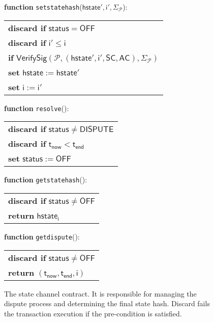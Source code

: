 \documentclass{llncs}
\newcommand{\chanstatus}{\mathsf{status}}
\newcommand{\chandispute}{\mathsf{DISPUTE}}
\newcommand{\chanoff}{\mathsf{OFF}}
\newcommand{\hstate}{\mathsf{hstate}}
\newcommand{\hstatei}{\mathsf{hstate}_{\monotoniccounter}}
\newcommand{\monotoniccounter}{\mathsf{i}}
\newcommand{\participant}{\mathcal{P}}
\newcommand{\statechannel}{\mathsf{SC}}
\newcommand{\verifysig}{\mathsf{VerifySig}}
\newcommand{\appcontract}{\mathsf{AC}}
\newcommand{\timenow}{\mathsf{t}_{\mathsf{now}}}
\newcommand{\timeend}{\mathsf{t}_{\mathsf{end}}}
\newcommand{\oninput}{\textcolor{entry}{\bf function }}
\newcommand{\stringlitt}[1]{\texttt{\textcolor{string}{#1}}}
\begin{document}
\begin{figure}[h]
\begin{boxedminipage}{\columnwidth}
		
		\begin{flushleft}
			\oninput  \stringlitt{setstatehash}($\hstate', \monotoniccounter', \Sigma_{\participant}$):
		\end{flushleft}
		\begin{tabular}{l}
			\quad \textbf{discard if} $\chanstatus = \chanoff$ \\
			\quad \textbf{discard if} $\monotoniccounter' \leq \monotoniccounter$ \\
			\quad \textbf{if} $\verifysig(\participant, (\hstate', \monotoniccounter', \statechannel, \appcontract), \Sigma_{\participant})$ \\
			\quad \quad \textbf{set} $\hstate := \hstate'$ \\
			\quad \quad \textbf{set} $\monotoniccounter := \monotoniccounter'$ \\
		\end{tabular}
		
		\begin{flushleft} 
			\oninput \stringlitt{resolve}(): 
		\end{flushleft}
		\begin{tabular}{l}
		\quad \textbf{discard if} $\chanstatus \neq \chandispute$ \\
		\quad \textbf{discard if} $\timenow < \timeend$ \\
		\quad \textbf{set} $\chanstatus := \chanoff$ 
		\end{tabular}
	
		\begin{flushleft} 
		\oninput \stringlitt{getstatehash}(): 
		\end{flushleft}
		\begin{tabular}{l}
		\quad \textbf{discard if} $\chanstatus \neq \chanoff$ \\
		\quad \textbf{return} $\hstatei$
		\end{tabular}
		
		\begin{flushleft} 
			\oninput \stringlitt{getdispute}(): 
		\end{flushleft}
		\begin{tabular}{l}
			\quad \textbf{discard if} $\chanstatus \neq \chanoff$ \\
			\quad \textbf{return} $(\timenow, \timeend, \monotoniccounter)$
		\end{tabular}
	\end{boxedminipage}
	\caption{The state channel contract. It is responsible for managing the dispute process and determining the final state hash.  Discard fails the transaction execution if the pre-condition is satisfied.} \label{fig:statechannel}
\end{figure}
\end{document}
